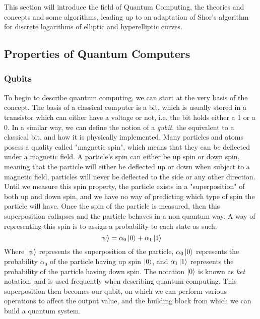 This section will introduce the field of Quantum Computing, the theories and concepts and some algorithms, leading up to an adaptation of Shor's algorithm for discrete logarithms of elliptic and hyperelliptic curves.
\subsection{Properties of Quantum Computers}
\subsubsection{Qubits}
To begin to describe quantum computing, we can start at the very basis of the concept. The basis of a classical computer is a bit, which is usually stored in a transistor which can either have a voltage or not, i.e. the bit holds either a 1 or a 0. In a similar way, we can define the notion of a \emph{qubit}, the equivalent to a classical bit, and how it is physically implemented. Many particles and atoms posess a quality called "magnetic spin", which means that they can be deflected under a magnetic field. A particle's spin can either be up spin or down spin, meaning that the particle will either be deflected up or down when subject to a magnetic field, particles will never be deflected to the side or any other direction. Until we measure this spin property, the particle exists in a "superposition" of both up and down spin, and we have no way of predicting which type of spin the particle will have. Once the spin of the particle is measured, then this superposition collapses and the particle behaves in a non quantum way. A way of representing this spin is to assign a probability to each state as such: $$\ket{\psi} = \alpha_0\ket{0} + \alpha_1\ket{1}$$ Where $\ket{\psi}$ represents the superposition of the particle, $\alpha_0\ket{0}$ represents the probability $\alpha_0$ of the particle having up spin $\ket{0}$, and $\alpha_1\ket{1}$ represents the probability of the particle having down spin. The notation $\ket{0}$ is known as \emph{ket} notation, and is used frequently when describing quantum computing. This superposition then becomes our qubit, on which we can perform various operations to affect the output value, and the building block from which we can build a quantum system.
